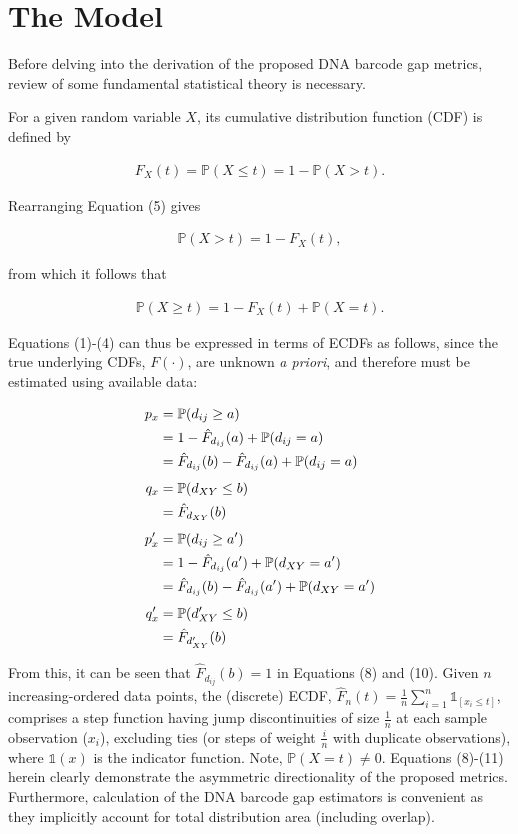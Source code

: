 \documentclass[12pt]{article}
\begin{document}
\section{The Model}

Before delving into the derivation of the proposed DNA barcode gap metrics, review of some fundamental statistical theory is necessary.

For a given random variable $X$, its cumulative distribution function (CDF) is defined by

\begin{align}
F_X(t) = \mathbb{P}(X \leq t) = 1 - \mathbb{P}(X > t). 
\end{align}

\noindent Rearranging Equation (5) gives

\begin{align}
\mathbb{P}(X > t) = 1 - F_X(t),
\end{align}

\noindent from which it follows that

\begin{align}
\mathbb{P}(X \geq t) = 1 - F_X(t) + \mathbb{P}(X = t).
\end{align}

Equations (1)-(4) can thus be expressed in terms of ECDFs as follows, since the true underlying CDFs, $F(\cdot)$, are unknown \textit{a priori}, and therefore must be estimated using available data:

\begin{align}
p_x  &= \mathbb{P}(d_{ij} \geq a) \notag \\
     &= 1 - \hat{F}_{d_{ij}}(a) + \mathbb{P}(d_{ij} = a) \notag \\
     &= \hat{F}_{d_{ij}}(b) - \hat{F}_{d_{ij}}(a) +  \mathbb{P}(d_{ij} = a) \\[1ex]
q_x  &=  \mathbb{P}(d_{XY} \leq b) \notag \\
     &= \hat{F}_{d_{XY}}(b) \\[1ex]
p'_x &=  \mathbb{P}(d_{ij} \geq a') \notag \\
     &= 1 - \hat{F}_{d_{ij}}(a') +  \mathbb{P}(d_{XY} = a') \notag \\
     &= \hat{F}_{d_{ij}}(b) - \hat{F}_{d_{ij}}(a') +  \mathbb{P}(d_{XY} = a')  \\[1ex]
q'_x &=  \mathbb{P}(d'_{XY} \leq b) \notag \\
     &= \hat{F}_{d'_{XY}}(b)
\end{align}

From this, it can be seen that $\hat{F}_{d_{ij}}(b) = 1$ in Equations (8) and (10). Given $n$ \\ increasing-ordered data points, the (discrete) ECDF, $\hat{F}_n(t) = \frac{1}{n}\sum_{i = 1}^n\mathds{1}_{[x_i \leq t]}$, comprises a step function having jump discontinuities of size $\frac{1}{n}$ at each sample observation ($x_i$), excluding ties (or steps of weight $\frac{i}{n}$ with duplicate observations), where $\mathds{1}(x)$ is the indicator function. Note, $\mathbb{P}(X = t) \neq 0$. Equations (8)-(11) herein clearly demonstrate the asymmetric directionality of the proposed metrics. Furthermore, calculation of the DNA barcode gap estimators is convenient as they implicitly account for total distribution area (including overlap).
\end{document}
